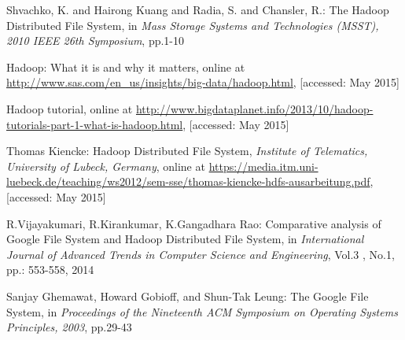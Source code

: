 \documentclass{sig-alternate}
\begin{document}
\begin{thebibliography}{4}

 Shvachko, K. and Hairong Kuang and Radia, S. and Chansler, R.: The Hadoop Distributed File System, in
\textit{Mass Storage Systems and Technologies (MSST), 2010 IEEE 26th Symposium}, pp.1-10

 Hadoop: What it is and why it matters, online at
\url{http://www.sas.com/en_us/insights/big-data/hadoop.html}, [accessed: May 2015]

 Hadoop tutorial, online at
\url{http://www.bigdataplanet.info/2013/10/hadoop-tutorials-part-1-what-is-hadoop.html}, [accessed: May 2015]

 Thomas Kiencke: Hadoop Distributed File System,
\textit{Institute of Telematics, University of Lubeck, Germany},
 online at
\url{https://media.itm.uni-luebeck.de/teaching/ws2012/sem-sse/thomas-kiencke-hdfs-ausarbeitung.pdf}, [accessed: May 2015]

 R.Vijayakumari, R.Kirankumar, K.Gangadhara Rao: Comparative analysis of Google File System and Hadoop Distributed File System, in \textit{International Journal of Advanced Trends in Computer Science and Engineering}, Vol.3 , No.1, pp.: 553-558, 2014

 Sanjay Ghemawat, Howard Gobioff, and Shun-Tak Leung: The Google File System, in
\textit{Proceedings of the Nineteenth ACM Symposium on Operating Systems Principles, 2003}, pp.29-43

\end{thebibliography}  


\balancecolumns
\end{document}
